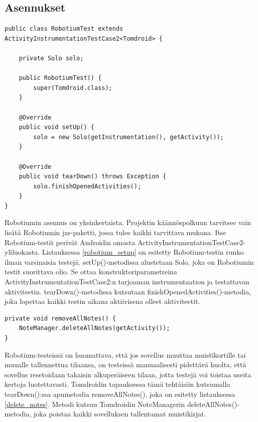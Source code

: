\subsection{Asennukset}

\begin{lstlisting}[float,label=robotium_setup,caption=Robotium-testirunko]
public class RobotiumTest extends ActivityInstrumentationTestCase2<Tomdroid> {

	private Solo solo;
	
	public RobotiumTest() {
		super(Tomdroid.class);
	}
	
	@Override
	public void setUp() {
		solo = new Solo(getInstrumentation(), getActivity());
	}
	
	@Override
	public void tearDown() throws Exception {
		solo.finishOpenedActivities();
	}
}
\end{lstlisting}

Robotiumin asennus on yksinkertaista. Projektin käännöspolkuun tarvitsee vain lisätä Robotiumin jar-paketti, jossa tulee kaikki tarvittava mukana. Itse Robotium-testit perivät Androidin omasta ActivityInstrumentationTestCase2-yliluokasta. Listauksessa \ref{robotium_setup} on esitetty Robotium-testin runko ilman varsinaisia testejä. setUp()-metodissa alustetaan Solo, joka on Robotiumin testit suorittava olio. Se ottaa konstruktoriparametreina ActivityInstrumentationTestCase2:n tarjoaman instrumentaation ja testattavan aktiviteetin. tearDown()-metodissa kutsutaan finishOpenedActivities()-metodia, joka lopettaa kaikki testin aikana aktiivisena olleet aktiviteetit.

\begin{lstlisting}[float,label=delete_notes,caption=Muistikirjojen poisto]
private void removeAllNotes() {
	NoteManager.deleteAllNotes(getActivity());
}
\end{lstlisting}

Robotium-testeissä on huomattava, että jos sovellus muuttaa muistikortille tai muualle tallennettua tilaansa, on testeissä manuaalisesti pidettävä huolta, että sovellus resetoidaan takaisin alkuperäiseen tilaan, jotta testejä voi toistaa useita kertoja luotettavasti. Tomdroidin tapauksessa tämä tehtäisiin kutsumalla tearDown():ssa apumetodia removeAllNotes(), joka on esitetty listauksessa \ref{delete_notes}. Metodi kutsuu Tomdroidin NoteManagerin deleteAllNotes()-metodia, joka poistaa kaikki sovelluksen tallentamat muistikirjat.

